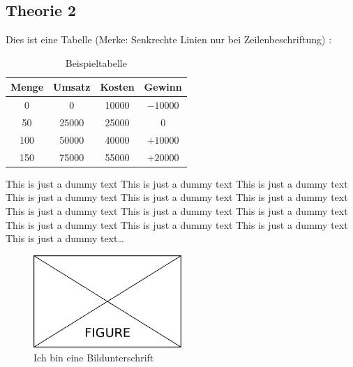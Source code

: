 \subsection{Theorie 2}
\label{sec:theorieB}

Dies ist eine Tabelle (Merke: Senkrechte Linien nur bei Zeilenbeschriftung)  :

\medskip
\begin{table}[!h]
	\centering
	{\renewcommand{\arraystretch}{1.5}
		\begin{tabular}{cccc}
			\toprule 
			Menge & Umsatz & Kosten & Gewinn \\ \midrule 
			0 & 0 & 10000 & $-10000$ \\ %
			50 & 25000 & 25000 & 0 \\ %
			100 & 50000 & 40000 & $+10000$ \\ %
			150 & 75000 & 55000 & $+20000$ \\
			\bottomrule 
		\end{tabular}
	}
	\caption{Beispieltabelle}
	\label{tab:BSP}
\end{table}

This is just a dummy text This is just a dummy text This is just a dummy text This is just a dummy text This is just a dummy text This is just a dummy text This is just a dummy text This is just a dummy text This is just a dummy text This is just a dummy text This is just a dummy text This is just a dummy text This is just a dummy text\dots

\bigskip
\begin{figure}[!h]
	\centering
	\includegraphics[width=0.5\textwidth]{Content/Figures/figure.png}
	\caption{Ich bin eine Bildunterschrift}
	\label{fig:test}
\end{figure}






